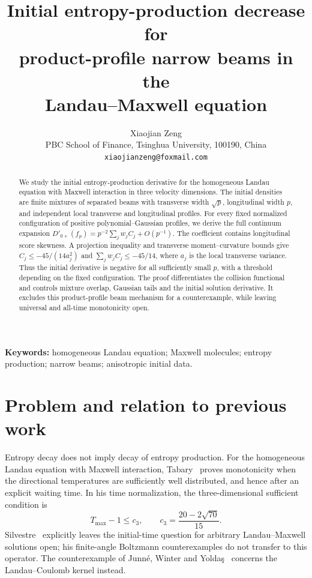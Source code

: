 \documentclass[11pt]{article}
\title{Initial entropy-production decrease for\\product-profile narrow beams in the\\Landau--Maxwell equation}
\author{Xiaojian Zeng\\
\small PBC School of Finance, Tsinghua University, 100190, China\\
\small \texttt{xiaojianzeng@foxmail.com}}
\date{}
\numberwithin{equation}{section}
\begin{document}
\maketitle

\begin{abstract}
We study the initial entropy-production derivative for the homogeneous
Landau equation with Maxwell interaction in three velocity dimensions.
The initial densities are finite mixtures of separated beams with
transverse width \(\sqrt p\), longitudinal width \(p\), and independent
local transverse and longitudinal profiles. For every fixed normalized
configuration of positive polynomial--Gaussian profiles, we derive the
full continuum expansion \(D'_{0+}(f_p)=p^{-2}\sum_j w_j C_j+O(p^{-1})\).
The coefficient contains longitudinal score skewness. A projection
inequality and transverse moment--curvature bounds give
\(C_j\leq-45/(14a_j^2)\) and \(\sum_j w_j C_j\leq-45/14\), where
\(a_j\) is the local transverse variance. Thus the initial derivative is
negative for all sufficiently small \(p\), with a threshold depending
on the fixed configuration. The proof differentiates the collision
functional and controls mixture overlap, Gaussian tails and the initial
solution derivative. It excludes this product-profile beam mechanism for
a counterexample, while leaving universal and all-time monotonicity open.
\end{abstract}

\noindent\textbf{Keywords:} homogeneous Landau equation; Maxwell molecules;
entropy production; narrow beams; anisotropic initial data.

\section{Problem and relation to previous work}

Entropy decay does not imply decay of entropy production. For the
homogeneous Landau equation with Maxwell interaction,
Tabary~\cite[Theorem 1.1]{Tabary2026} proves monotonicity when the
directional temperatures are sufficiently well distributed, and hence
after an explicit waiting time. In his time normalization, the
three-dimensional sufficient condition is
\begin{equation}\label{eq:tabary}
 T_{\max}-1\leq c_3,\qquad c_3=\frac{20-2\sqrt{70}}{15}.
\end{equation}
Silvestre~\cite[Section 1.2]{Silvestre2026} explicitly leaves the
initial-time question for arbitrary Landau--Maxwell solutions open; his
finite-angle Boltzmann counterexamples do not transfer to this operator.
The counterexample of Junn\'e, Winter and Yolda\c{s}~\cite{Junne2026}
concerns the Landau--Coulomb kernel instead.
\end{document}
